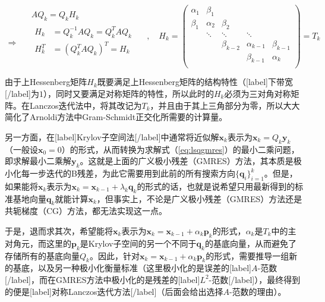 \documentclass[UTF8,nofonts]{ctexart}
\begin{document}
\begin{equation}
	\label{eq:tk}
	\begin{aligned}
		& AQ_k=Q_kH_k \\
		\Longrightarrow\quad &
		\begin{aligned}
			H_k &= Q_k^{-1}AQ_k=Q_k^TAQ_k \\
			H_k^T &= (Q_k^TAQ_k)^T=H_k \\
		\end{aligned}
	\end{aligned}\quad,\quad
	H_k=
	\begin{pmatrix}
		\alpha_1 & \beta_1 & & & \\
		\beta_1 & \alpha_2 & \beta_2 & & \\
		& \ddots & \ddots & \ddots & \\
		& & \beta_{k-2} & \alpha_{k-1} & \beta_{k-1}\\
		& & & \beta_{k-1} & \alpha_k \\
	\end{pmatrix}=T_k
\end{equation}

由于上Hessenberg矩阵$H_k$既要满足上Hessenberg矩阵的结构特性（[label]下带宽[/label]为$1$），同时又要满足对称矩阵的特性，所以此时的$H_k$必须为三对角对称矩阵。在Lanczos迭代法中，将其改记为$T_k$，并且由于其上三角部分为零，所以大大简化了Arnoldi方法中Gram-Schmidt正交化所需要的计算量。

另一方面，在[label]Krylov子空间法[/label]中通常将近似解$\boldsymbol{x}_k$表示为$\boldsymbol{x}_k=Q_k\boldsymbol{y}_k$（一般设$\boldsymbol{x}_0=0$）的形式，从而转换为求解式（\ref{eq:lsqgmres}）的最小二乘问题，即求解最小二乘解$\boldsymbol{y}_k$。这就是上面的广义极小残差（GMRES）方法，其本质是极小化每一步迭代的B残差，为此它需要用到此前的所有搜索方向$\{\boldsymbol{q}_i\}_{i=1}^k$。但是，如果能将$\boldsymbol{x}_k$表示为$\boldsymbol{x}_k=\boldsymbol{x}_{k-1}+\lambda_k\boldsymbol{q}_k$的形式的话，也就是说希望只用最新得到的标准基地向量$\boldsymbol{q}_k$就能计算$\boldsymbol{x}_k$，但事实上，不论是广义极小残差（GMRES）方法还是共轭梯度（CG）方法，都无法实现这一点。

于是，退而求其次，希望能将$\boldsymbol{x}_k$表示为$\boldsymbol{x}_k=\boldsymbol{x}_{k-1}+\alpha_k\boldsymbol{p}_k$的形式，$\alpha_k$是$T_k$中的主对角元，而这里的$\boldsymbol{p}_k$是Krylov子空间的另一个不同于$\boldsymbol{q}_k$的基底向量，从而避免了存储所有的基底向量$Q_k$。因此，针对$\boldsymbol{x}_k=\boldsymbol{x}_{k-1}+\alpha_k\boldsymbol{p}_k$的形式，需要推导一组新的基底，以及另一种极小化衡量标准（这里极小化的是误差的[label]$A$-范数[/label]，而在GMRES方法中极小化的是残差的[label]$L^2$-范数[/label]），最终得到的便是[label]对称Lanczos迭代方法[/label]（后面会给出选择$A$-范数的理由）。
\end{document}
